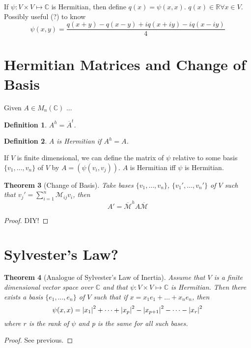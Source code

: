 \documentclass{notes}
\theoremstyle{plain}
\newtheorem{theorem}{Theorem}[chapter]
\newtheorem{definition}[theorem]{Definition}
\begin{document}
If $\psi : V \times V \mapsto \mathbb{C}$ is Hermitian, then define
$q(x) = \psi(x,x)$.  $q(x) \in \mathbb{R} \forall x \in V$.  Possibly
useful (?) to know
\[
\psi(x,y)=\frac{q(x+y)-q(x-y)+iq(x+iy)-iq(x-iy)}{4}
\]

\section{Hermitian Matrices and Change of Basis}

Given $A \in M_n(\mathbb{C})$ ...

\begin{definition}
  $A^h = \overline{A}^t$.
\end{definition}

\begin{definition}
  $A$ is Hermitian if $A^h = A$.
\end{definition}

If $V$ is finite dimensional, we can define the matrix of $\psi$
relative to some basis $\{v_1,\dots,v_n\}$ of $V$ by $A =
\left(\psi(v_i,v_j)\right)$.  $A$ is Hermitian iff $\psi$ is
Hermitian.

\begin{theorem}[Change of Basis]
  Take bases $\{v_1,\dots ,v_n\}$, $\{v_1',\dots ,v_n'\}$
of $V$ such that $v_j' = \sum_{i=1}^n \mathcal{M}_{ij}v_i$, then
\[
A' = \overline{\mathcal{M}}^hA\overline{\mathcal{M}}
\]
\end{theorem}

\begin{proof}
  DIY!
\end{proof}

\section{Sylvester's Law?}

\begin{theorem}[Analogue of Sylvester's Law of Inertia]
  Assume that $V$ is a finite dimensional vector space over $\mathbb{C}$
  and that $\psi : V \times V \mapsto \mathbb{C}$ is Hermitian.  Then
  there exists a basis $\{e_1, \dots ,e_n\}$ of $V$ such that if
  $x=x_1e_1+ \dots + x_ne_n$, then
\[
\psi(x,x) = \left|x_1\right|^2 + \dots + \left|x_p\right|^2 - \left|x_{p+1}\right|^2 -
\dots - \left|x_r\right|^2
\]
where $r$ is the rank of $\psi$ and p is the same for all such bases.
\end{theorem}

\begin{proof}
  See previous.
\end{proof}
\end{document}
